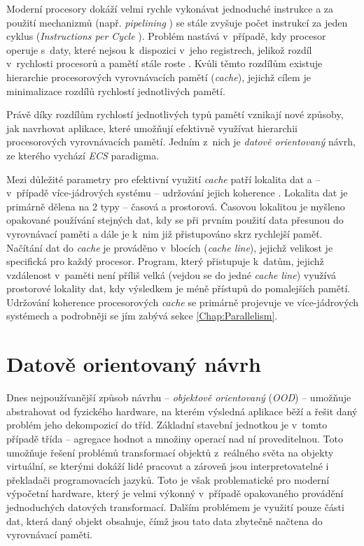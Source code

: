 Moderní procesory dokáží velmi rychle vykonávat jednoduché instrukce a za použití mechanizmů (např. \emph{pipelining} \cite{Pipelining}) se stále zvyšuje počet instrukcí za jeden cyklus (\emph{Instructions per Cycle} \cite{CpuIpc}). Problém nastává v~případě, kdy procesor operuje s~daty, které nejsou k~dispozici v~jeho registrech, jelikož rozdíl v~rychlosti procesorů a pamětí stále roste \cite{CpuMemoryGap}. Kvůli těmto rozdílům existuje hierarchie procesorových vyrovnávacích pamětí (\emph{cache}), jejichž cílem je minimalizace rozdílů rychlostí jednotlivých pamětí.

Právě díky rozdílům rychlostí jednotlivých typů pamětí \cite{MemoryTiming} vznikají nové způsoby, jak navrhovat aplikace, které umožňují efektivně využívat hierarchii procesorových vyrovnávacích pamětí. Jedním z~nich je \emph{datově orientovaný} návrh, ze kterého vychází \emph{ECS} paradigma.

Mezi důležité parametry pro efektivní využití \emph{cache} patří lokalita dat \cite{DataLocality} a -- v~případě více-jádrových systému -- udržování jejich koherence \cite{CacheCoherence}. Lokalita dat je primárně dělena na 2 typy -- časová a prostorová. Časovou lokalitou je myšleno opakované používání stejných dat, kdy se při prvním použití data přesunou do vyrovnávací paměti  a dále je k~nim již přistupováno skrz rychlejší paměť. Načítání dat do \emph{cache} je prováděno v~blocích (\emph{cache line}), jejichž velikost je specifická pro každý procesor. Program, který přistupuje k~datům, jejichž vzdálenost v~paměti není příliš velká (vejdou se do jedné \emph{cache line}) využívá prostorové lokality dat, kdy výsledkem je méně přístupů do pomalejších pamětí. Udržování koherence procesorových \emph{cache} se primárně projevuje ve více-jádrových systémech a podrobněji se jím zabývá sekce \ref{Chap:Parallelism}.

\section{Datově orientovaný návrh}
\label{Chap:DDD}

Dnes nejpoužívanější způsob návrhu -- \emph{objektově orientovaný} (\emph{OOD}) -- umožňuje abstrahovat od fyzického hardware, na kterém výsledná aplikace běží a řešit daný problém jeho dekompozicí do tříd. Základní stavební jednotkou je v~tomto případě třída -- agregace hodnot a  množiny operací nad ní proveditelnou. Toto umožňuje řešení problémů transformací objektů z~reálného světa na objekty virtuální, se kterými dokáží lidé pracovat a zároveň jsou interpretovatelné i překladači programovacích jazyků. Toto je však problematické pro moderní výpočetní hardware, který je velmi výkonný v~případě opakovaného provádění jednoduchých datových transformací. Dalším problémem je využití pouze části dat, která daný objekt obsahuje, čímž jsou tato data zbytečně načtena do vyrovnávací paměti.


